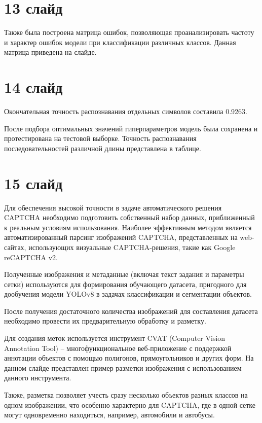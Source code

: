 \documentclass{altsu-report}
\begin{document}
\section*{13 слайд}

Также была построена матрица ошибок, позволяющая проанализировать частоту и 
характер ошибок модели при классификации различных классов. Данная матрица 
приведена на слайде.

\section*{14 слайд}

Окончательная точность распознавания отдельных символов составила 0.9263.

После подбора оптимальных значений гиперпараметров модель была сохранена и 
протестирована на тестовой выборке. Точность распознавания последовательностей 
различной длины представлена в таблице.

\section*{15 слайд}

Для обеспечения высокой точности в задаче автоматического решения CAPTCHA 
необходимо подготовить собственный набор данных, приближенный к реальным условиям 
использования. Наиболее эффективным методом является автоматизированный парсинг 
изображений CAPTCHA, представленных на web-сайтах, использующих визуальные 
CAPTCHA-решения, такие как Google reCAPTCHA v2.

Полученные изображения и метаданные (включая текст задания и параметры сетки) 
используются для формирования обучающего датасета, пригодного для дообучения 
модели YOLOv8 в задачах классификации и сегментации объектов.

После получения достаточного количества изображений для составления датасета 
необходимо провести их предварительную обработку и разметку.

Для создания меток используется инструмент CVAT (Computer Vision Annotation Tool) 
-- многофункциональное веб-приложение с поддержкой аннотации объектов с помощью 
полигонов, прямоугольников и других форм. На данном слайде представлен пример 
разметки изображения с использованием данного инструмента.

Также, разметка позволяет учесть сразу несколько объектов разных классов на 
одном изображении, что особенно характерно для CAPTCHA, где в одной сетке могут 
одновременно находиться, например, автомобили и автобусы.
\end{document}
